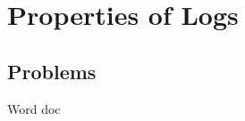 \newpage
\noindent{}



\newpage
\section{Properties of Logs}
\subsection{Problems}
Word doc
\newpage

\newpage
